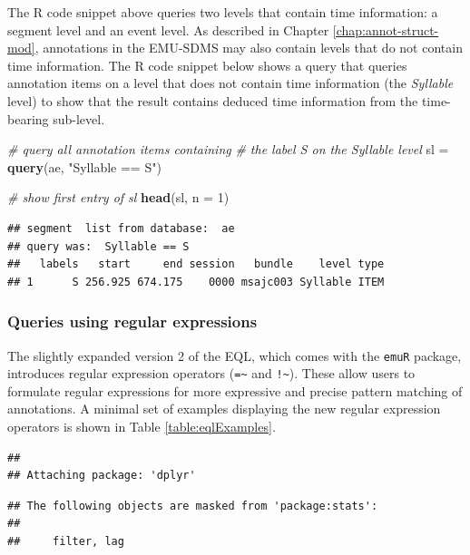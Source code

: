 \documentclass[]{book}
\newenvironment{Shaded}{\begin{snugshade}}{\end{snugshade}}
\newcommand{\CommentTok}[1]{\textcolor[rgb]{0.56,0.35,0.01}{\textit{#1}}}
\newcommand{\DataTypeTok}[1]{\textcolor[rgb]{0.13,0.29,0.53}{#1}}
\newcommand{\DecValTok}[1]{\textcolor[rgb]{0.00,0.00,0.81}{#1}}
\newcommand{\KeywordTok}[1]{\textcolor[rgb]{0.13,0.29,0.53}{\textbf{#1}}}
\newcommand{\NormalTok}[1]{#1}
\newcommand{\StringTok}[1]{\textcolor[rgb]{0.31,0.60,0.02}{#1}}
\begin{document}
The R code snippet above queries two levels that contain time information: a segment level and an event level. As described in Chapter \ref{chap:annot-struct-mod}, annotations in the EMU-SDMS may also contain levels that do not contain time information. The R code snippet below shows a query that queries annotation items on a level that does not contain time information (the \emph{Syllable} level) to show that the result contains deduced time information from the time-bearing sub-level.

\begin{Shaded}
\begin{Highlighting}[]
\CommentTok{# query all annotation items containing}
\CommentTok{# the label S on the Syllable level}
\NormalTok{sl =}\StringTok{ }\KeywordTok{query}\NormalTok{(ae, }\StringTok{"Syllable == S"}\NormalTok{)}

\CommentTok{# show first entry of sl}
\KeywordTok{head}\NormalTok{(sl, }\DataTypeTok{n =} \DecValTok{1}\NormalTok{)}
\end{Highlighting}
\end{Shaded}

\begin{verbatim}
## segment  list from database:  ae 
## query was:  Syllable == S 
##   labels   start     end session   bundle    level type
## 1      S 256.925 674.175    0000 msajc003 Syllable ITEM
\end{verbatim}

\hypertarget{queries-using-regular-expressions}{%
\subsubsection{Queries using regular expressions}\label{queries-using-regular-expressions}}

The slightly expanded version 2 of the EQL, which comes with the \texttt{emuR} package, introduces regular expression operators (\texttt{=\textasciitilde{}} and \texttt{!\textasciitilde{}}). These allow users to formulate regular expressions for more expressive and precise pattern matching of annotations. A minimal set of examples displaying the new regular expression operators is shown in Table \ref{table:eqlExamples}.

\begin{verbatim}
## 
## Attaching package: 'dplyr'
\end{verbatim}

\begin{verbatim}
## The following objects are masked from 'package:stats':
## 
##     filter, lag
\end{verbatim}
\end{document}
